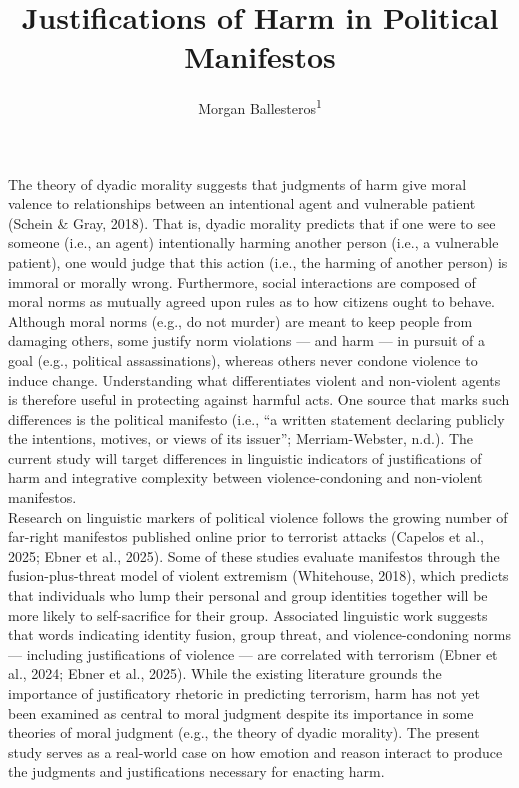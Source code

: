 \documentclass[
  english,
  man]{apa6}
\title{Justifications of Harm in Political Manifestos}
\author{Morgan Ballesteros\textsuperscript{1}}
\date{}
\affiliation{\vspace{0.5cm}\textsuperscript{1} University of Chicago}
\begin{document}
\maketitle

The theory of dyadic morality suggests that judgments of harm give moral valence to
relationships between an intentional agent and vulnerable patient (Schein \& Gray, 2018).
That is, dyadic morality predicts that if one were to see someone (i.e., an agent) intentionally harming another person (i.e., a vulnerable patient), one would judge that this action (i.e., the harming of another person) is immoral or morally wrong. Furthermore, social interactions are composed of moral norms as mutually agreed upon rules as to how citizens ought to behave. Although moral norms (e.g., do not murder) are meant to keep people from damaging others, some justify norm violations --- and harm --- in pursuit of a goal (e.g., political assassinations), whereas others never condone violence to induce change. Understanding what differentiates violent and non-violent agents is therefore useful in protecting against harmful acts. One source that marks such differences is the political manifesto (i.e., ``a written statement declaring publicly the intentions, motives, or views of its issuer''; Merriam-Webster, n.d.). The current study will target differences in linguistic indicators of justifications of harm and integrative complexity between violence-condoning and non-violent manifestos.\\
Research on linguistic markers of political violence follows the growing number of far-right
manifestos published online prior to terrorist attacks (Capelos et al., 2025; Ebner et al.,
2025). Some of these studies evaluate manifestos through the fusion-plus-threat model of
violent extremism (Whitehouse, 2018), which predicts that individuals who lump their personal
and group identities together will be more likely to self-sacrifice for their group.
Associated linguistic work suggests that words indicating identity fusion, group threat, and
violence-condoning norms --- including justifications of violence --- are correlated with
terrorism (Ebner et al., 2024; Ebner et al., 2025). While the existing literature grounds the
importance of justificatory rhetoric in predicting terrorism, harm has not yet been examined
as central to moral judgment despite its importance in some theories of moral judgment (e.g.,
the theory of dyadic morality). The present study serves as a real-world case on how emotion
and reason interact to produce the judgments and justifications necessary for enacting harm.
\end{document}
